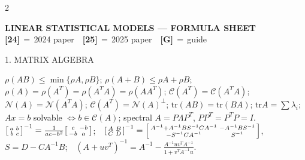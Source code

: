 \documentclass[10pt,a4paper]{article}
\newcommand{\spyq}[1]{{\tiny\color{Yellow}\textbf{[#1]}}}
\newcommand{\sect}[1]{\vspace{2pt}\noindent\colorbox{Blue!78}{\parbox{0.955\columnwidth}%
{\color{white}\bfseries\scriptsize\let\pyq\spyq\strut #1}}\vspace{1pt}\par}
\newcommand{\pyq}[1]{{\tiny\color{BrickRed}\textbf{[#1]}}}
\newcommand{\tr}{\mathrm{tr}}\newcommand{\Cs}{\mathcal{C}}\newcommand{\Nsp}{\mathcal{N}}
\begin{document}
\scriptsize
\raggedcolumns
\begin{multicols}{2}

\begin{center}\vspace{-6pt}
{\footnotesize\bfseries LINEAR STATISTICAL MODELS --- FORMULA SHEET}\\
{\tiny \pyq{24}\,$=$\,2024 paper\ \ \pyq{25}\,$=$\,2025 paper\ \ \pyq{G}\,$=$\,guide}
\end{center}\vspace{-2pt}

\sect{1. MATRIX ALGEBRA}
$\rho(AB)\le\min\{\rho A,\rho B\}$; $\rho(A{+}B)\le\rho A{+}\rho B$; $\rho(A)=\rho(A^T)=\rho(A^TA)=\rho(AA^T)$;
$\Cs(A^T)=\Cs(A^TA)$; $\Nsp(A)=\Nsp(A^TA)$; $\Cs(A^T)=\Nsp(A)^\perp$; $\tr(AB)=\tr(BA)$; $\tr A=\sum\lambda_i$;
$Ax{=}b$ solvable $\iff b\in\Cs(A)$; spectral $A{=}P\Lambda P^T$, $PP^T{=}P^TP{=}I$.\\
$\begin{bsmallmatrix}a&b\\b&c\end{bsmallmatrix}^{-1}=\frac{1}{ac-b^2}\begin{bsmallmatrix}c&-b\\-b&a\end{bsmallmatrix}$;\ \
$\begin{bsmallmatrix}A&B\\C&D\end{bsmallmatrix}^{-1}=\begin{bsmallmatrix}A^{-1}+A^{-1}BS^{-1}CA^{-1}&-A^{-1}BS^{-1}\\-S^{-1}CA^{-1}&S^{-1}\end{bsmallmatrix}$, $S{=}D{-}CA^{-1}B$;\ \
$(A{+}uv^T)^{-1}=A^{-1}-\frac{A^{-1}uv^TA^{-1}}{1+v^TA^{-1}u}$.


\end{multicols}
\end{document}
